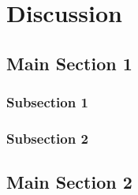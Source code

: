 
\chapter{Discussion} %

\label{Chapter4} %


\section{Main Section 1}



\subsection{Subsection 1}



\subsection{Subsection 2}



\section{Main Section 2}


